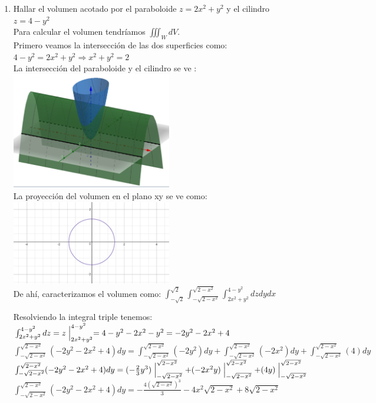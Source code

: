 \documentclass{article}
\begin{document}
\begin{enumerate}
{	
    }
    
   \item {
   Hallar el volumen acotado por el paraboloide $z = 2x^2 + y^2$ y el cilindro $z = 4 - y^2$\\

		Para calcular el volumen tendríamos $\iiint_W dV$.\\
		
		Primero veamos la intersección de las dos superficies como: $4-y^2 = 2x^2 + y^2 \Rightarrow x^2+y^2 = 2$\\

		La intersección del paraboloide y el cilindro se ve :
		\includegraphics[width=7cm]{ejercicio7.png}\\
		
		La proyección del volumen en el plano xy se ve como:
		\includegraphics[width=7cm]{ejercicio71.png}\\
		
		De ahí, caracterizamos el volumen como: $\int_{-\sqrt{2}}^{\sqrt{2}}\int_{-\sqrt{2-x^2}}^{\sqrt{2-x^2}}\int_{2x^2+y^2}^{4-y^2}dzdydx$
	
		Resolviendo la integral triple tenemos:\\
		$\int_{2x^2+y^2}^{4-y^2}dz = z\Bigm|_{2x^2+y^2}^{4-y^2} = 4-y^2-2x^2-y^2 = -2y^2-2x^2+4 $\\
		
		$\int_{-\sqrt{2-x^2}}^{\sqrt{2-x^2}} (-2y^2-2x^2+4)dy = \int_{-\sqrt{2-x^2}}^{\sqrt{2-x^2}} (-2y^2)dy +  \int_{-\sqrt{2-x^2}}^{\sqrt{2-x^2}} (-2x^2)dy + \int_{-\sqrt{2-x^2}}^{\sqrt{2-x^2}} (4)dy $\\
		$\int_{-\sqrt{2-x^2}}^{\sqrt{2-x^2}} (-2y^2-2x^2+4)dy = (-\frac{2}{3}y^3)\Bigm|_{-\sqrt{2-x^2}}^{\sqrt{2-x^2}} + (-2x^2y)\Bigm|_{-\sqrt{2-x^2}}^{\sqrt{2-x^2}} + (4y)\Bigm|_{-\sqrt{2-x^2}}^{\sqrt{2-x^2}}$\\
		$\int_{-\sqrt{2-x^2}}^{\sqrt{2-x^2}} (-2y^2-2x^2+4)dy = -\frac{4(\sqrt{2-x^2})^3}{3} -4x^2\sqrt{2-x^2} + 8\sqrt{2-x^2} $\\
		
}
\end{enumerate}
\end{document}
